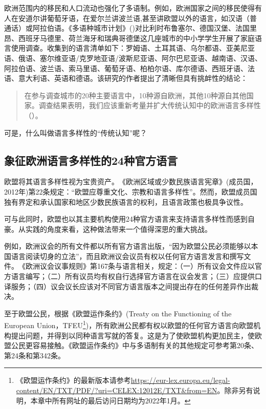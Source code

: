 \documentclass[output=paper]{langscibook}
\begin{document}
\begin{sloppypar}
‌欧洲范围内的移民和人口流动也强化了多语制。‌例如，欧洲国家之间的移民使得有人在安道尔讲葡萄牙语，在爱尔兰讲波兰语,甚至讲欧盟以外的语言，如汉语（普通话）或阿拉伯语。《多语种城市计划》(\citealt{ExtraYagmur2005})对比利时布鲁塞尔、德国汉堡、法国里昂、西班牙马德里、荷兰海牙和瑞典哥德堡这几座城市的中小学学生开展了家庭语言使用调查。‌收集到的语言清单如下：‌罗姆语、土耳其语、乌尔都语、亚美尼亚语、俄语、塞尔维亚语/克罗地亚语/波斯尼亚语、阿尔巴尼亚语、越南语、汉语、阿拉伯语、波兰语、索马里语、葡萄牙语、柏柏尔语、库尔德语、西班牙语、法语、意大利语、英语和德语。该研究的作者提出了清晰但具有挑衅性的结论：
\end{sloppypar}

\begin{quote}
‌在参与调查城市的20种主要语言中，10种源自欧洲，其他10种源自其他国家。调查结果表明，我们应该重新考量并扩大传统认知中的欧洲语言多样性（\citealt{ExtraYagmur2005}）。
\end{quote}

可是，什么叫做语言多样性的“传统认知”呢？

\subsection{‌象征欧洲语言多样性的24种官方语言}\largerpage
欧盟将其语言多样性视为宝贵资产。‌《欧洲区域或少数民族语言宪章》(成员国，2012年)第22条规定：“欧盟应尊重文化、宗教和语言多样性”。‌然而，欧盟成员国独有界定和承认国家和地区少数民族语言的权利，且语言政策也极具争议性。

‌可与此同时，欧盟也以其主要机构使用24种官方语言来支持语言多样性而感到自豪。‌从实践的角度来看，这种做法带来一个值得深思的重大挑战。\largerpage

‌例如，欧洲议会的所有文件都以所有官方语言出版，“因为欧盟公民必须能够以本国语言阅读切身的立法”\citep{EuropeanParliament2020}，而且欧洲议会议员有权以任何官方语言发言和撰写文件。‌《欧洲议会议事规则》第167条与语言相关，规定：（一）所有议会文件应以官方语言编写；（二）所有议员均有权自行选择官方语言在议会发言；（三）应提供口译服务；（四）议会议长应该对不同官方语言版本之间提出存在的任何差异作出裁决\citep{EuropeanParliament2021}。

‌至于欧盟公民，根据《欧盟运作条约》(Treaty on the Functioning of the European Union，TFEU\footnote{《欧盟运作条约》的最新版本请参考\url{https://eur-lex.europa.eu/legal-content/EN/TXT/PDF/?uri=CELEX:12012E/TXT\&from=EN}。‌除非另有说明，本章中所有网址的最后访问日期均为2022年1月。})，所有欧洲公民都有权以欧盟的任何官方语言向欧盟机构提出问题，并得到以同种语言写就的答复。这是为了使欧盟机构更加民主，使欧盟公民更容易接触。《欧盟运作条约》中与多语制有关的其他规定可参考第20条、第24条和第342条。
\end{document}

